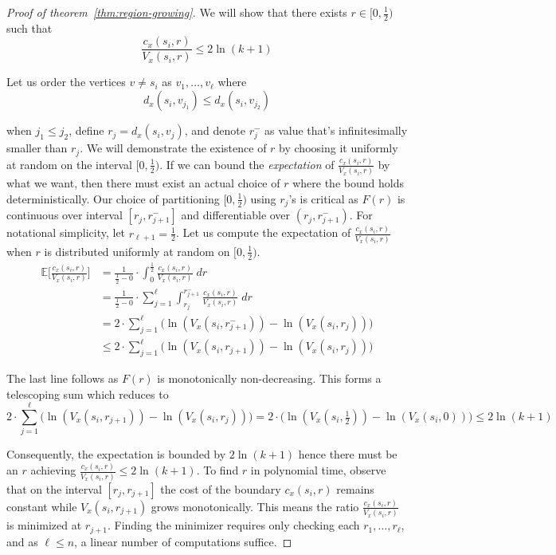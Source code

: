 \begin{proof}[Proof of theorem~\ref{thm:region-growing}]
We will show that there exists $r \in [0, \frac{1}{2})$ such that
\begin{equation*}
\frac{c_x(s_i, r)}{V_x(s_i, r)} \leq 2 \ln(k+1)
\end{equation*}

Let us order the vertices $v \neq s_i$ as $v_1, \ldots, v_{\ell}$ where
\begin{equation*}
d_x(s_i, v_{j_1}) \leq d_x(s_i, v_{j_2})
\end{equation*}

when $j_1 \leq j_2$, define $r_j = d_x(s_i, v_j)$, and denote $r_j^-$ as value that's infinitesimally smaller than $r_j$. We will demonstrate the existence of $r$ by choosing it uniformly at random on the interval $[0, \frac{1}{2})$. If we can bound the \emph{expectation} of $\frac{c_x(s_i, r)}{V_x(s_i, r)}$ by what we want, then there must exist an actual choice of $r$ where the bound holds deterministically. Our choice of partitioning $[0, \frac{1}{2})$ using $r_j$'s is critical as $F(r)$ is continuous over interval $[r_j, r_{j+1}^{-}]$ and differentiable over $(r_j, r_{j+1}^-)$. For notational simplicity, let $r_{\ell + 1} = \frac{1}{2}$. Let us compute the expectation of $\frac{c_x(s_i, r)}{V_x(s_i, r)}$ when $r$ is distributed uniformly at random on $[0, \frac{1}{2})$.
\begin{align*}
\mathbb{E} \bigg[ \frac{c_x(s_i, r)}{V_x(s_i, r)} \bigg]
&= \frac{1}{\frac{1}{2} - 0} \cdot \int_0^{\frac{1}{2}} \frac{c_x(s_i, r)}{V_x(s_i, r)} \; dr \\
&= \frac{1}{\frac{1}{2} - 0} \cdot \sum_{j = 1}^{\ell} \int_{r_j}^{r_{j+1}^-} \frac{c_x(s_i, r)}{V_x(s_i, r)} \; dr \\
&= 2 \cdot \sum_{j=1}^\ell \Big( \ln(V_x(s_i, r^-_{j+1})) - \ln(V_x(s_i, r_{j})) \Big) \\
&\leq 2 \cdot \sum_{j=1}^\ell \Big( \ln(V_x(s_i, r_{j+1})) - \ln(V_x(s_i, r_{j})) \Big)
\end{align*}

The last line follows as $F(r)$ is monotonically non-decreasing. This forms a telescoping sum which reduces to
\begin{equation*}
2 \cdot \sum_{j=1}^\ell \Big( \ln(V_x(s_i, r_{j+1})) - \ln(V_x(s_i, r_{j})) \Big)
= 2 \cdot \Big( \ln(V_x(s_i, \tfrac{1}{2})) - \ln(V_x(s_i, 0)) \Big)
\leq 2 \ln(k+1)
\end{equation*}

Consequently, the expectation is bounded by $2 \ln(k+1)$ hence there must be an $r$ achieving $\frac{c_x(s_i, r)}{V_x(s_i, r)} \leq 2 \ln(k+1)$. To find $r$ in polynomial time, observe that on the interval $[r_j, r_{j+1}]$ the cost of the boundary $c_x(s_i, r)$ remains constant while $V_x(s_i, r_{j+1})$ grows monotonically. This means the ratio $\frac{c_x(s_i, r)}{V_x(s_i, r)}$ is minimized at $r_{j+1}$. Finding the minimizer requires only checking each $r_1, \ldots, r_{\ell}$, and as $\ell \leq n$, a linear number of computations suffice.
\end{proof}
